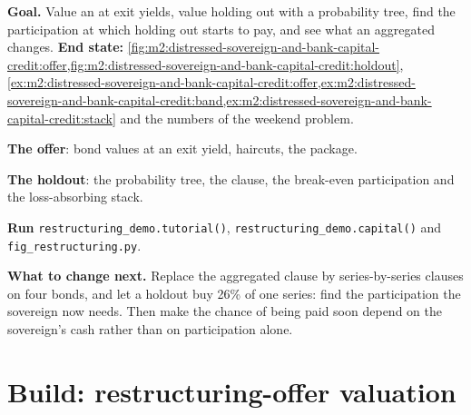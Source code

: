 \begin{tutorial}
\textbf{Goal.} Value an  at exit yields, value holding out with a
probability tree, find the participation at which holding out starts to pay, and see
what an aggregated  changes.
\textbf{End state:} \cref{fig:m2:distressed-sovereign-and-bank-capital-credit:offer,fig:m2:distressed-sovereign-and-bank-capital-credit:holdout},
\cref{ex:m2:distressed-sovereign-and-bank-capital-credit:offer,ex:m2:distressed-sovereign-and-bank-capital-credit:band,ex:m2:distressed-sovereign-and-bank-capital-credit:stack}
and the numbers of the weekend problem.
\begin{tutsteps}
\item \textbf{The offer}: bond values at an exit yield, haircuts, the package.
\label{lst:m2:distressed-sovereign-and-bank-capital-credit:offer}
\item \textbf{The holdout}: the probability tree, the clause, the break-even participation
and the loss-absorbing stack.
\label{lst:m2:distressed-sovereign-and-bank-capital-credit:holdout}
\item \textbf{Run} \texttt{restructuring\_demo.tutorial()},
\texttt{restructuring\_demo.capital()} and \texttt{fig\_restructuring.py}.
\end{tutsteps}
\textbf{What to change next.} Replace the aggregated clause by series-by-series
clauses on four bonds, and let a holdout buy 26\% of one series: find the participation
the sovereign now needs. Then make the chance of being paid soon depend on the
sovereign's cash rather than on participation alone.
\end{tutorial}

\section{Build: restructuring-offer valuation}\label{bld:m2:distressed-sovereign-and-bank-capital-credit:recovery}

